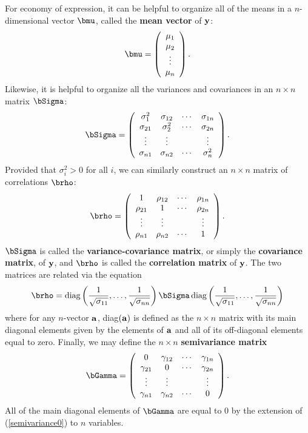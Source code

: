 For economy of expression, it can be helpful to organize all of the means in a $n$-dimensional vector $\bmu$, called the {\bf mean vector} of ${\bf y}$:
\[ \bmu=\left(\begin{array}{c}\mu_1\\\mu_2\\ \vdots \\ \mu_n\end{array}\right). \]
Likewise, it is helpful to organize all the variances and covariances in an $n\times n$ matrix $\bSigma$:
\[ \bSigma=\left(\begin{array}{cccc}
\sigma_1^2 & \sigma_{12} & \cdots & \sigma_{1n} \\
\sigma_{21} & \sigma_2^2 & \cdots & \sigma_{2n} \\
\vdots & \vdots & & \vdots \\
\sigma_{n1} & \sigma_{n2} & \cdots & \sigma_n^2 \end{array}\right) . \] 
Provided that $\sigma_i^2>0$ for all $i$, we can similarly construct an $n\times n$ matrix of correlations $\brho$:
\[ \brho=\left(\begin{array}{cccc}
1 & \rho_{12} & \cdots & \rho_{1n} \\
\rho_{21} & 1 & \cdots & \rho_{2n} \\
\vdots & \vdots & & \vdots \\
\rho_{n1} & \rho_{n2} & \cdots & 1 \end{array}\right). \]
$\bSigma$ is called the {\bf variance-covariance matrix}, or simply the {\bf covariance matrix}, of ${\bf y}$, and $\brho$ is called the {\bf correlation matrix} of ${\bf y}$.  The two matrices are related via the equation
\[ \brho=\mbox{diag}\left(\frac{1}{\sqrt{\sigma_{11}}},\ldots,\frac{1}{\sqrt{\sigma_{nn}}}\right)\bSigma\,\mbox{diag}\left(\frac{1}{\sqrt{\sigma_{11}}},\ldots,\frac{1}{\sqrt{\sigma_{nn}}}\right) \]
where for any $n$-vector ${\bf a}$, diag$({\bf a})$ is defined as the $n\times n$ matrix with its main diagonal elements given by the elements of ${\bf a}$ and all of its off-diagonal elements equal to zero.  Finally, we may define the $n\times n$ {\bf semivariance matrix}
\[ \bGamma=\left(\begin{array}{cccc}
0 & \gamma_{12} & \cdots & \gamma_{1n} \\
\gamma_{21} & 0 & \cdots & \gamma_{2n} \\
\vdots & \vdots & & \vdots \\
\gamma_{n1} & \gamma_{n2} & \cdots & 0 \end{array}\right) . \]
All of the main diagonal elements of $\bGamma$ are equal to 0 by the extension of (\ref{semivariance0}) to $n$ variables.

